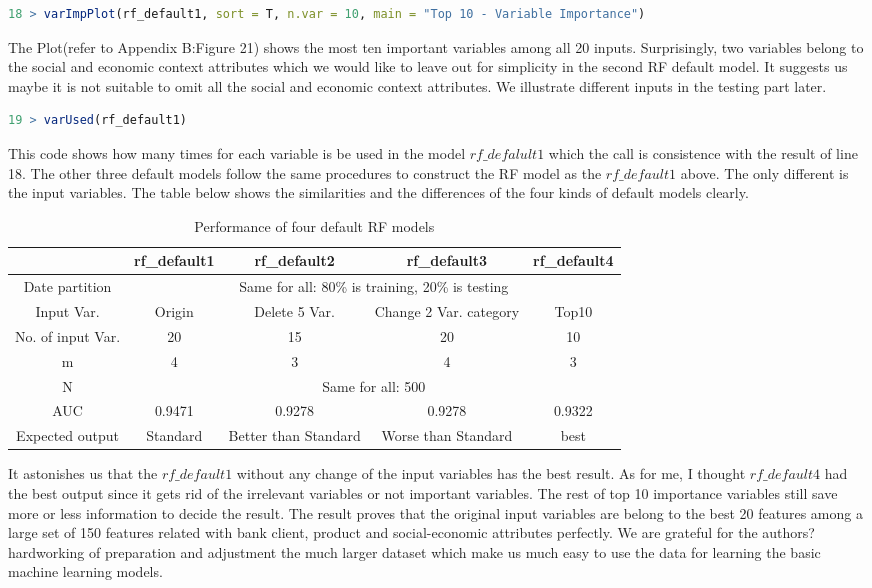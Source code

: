 \documentclass[12pt, a4paper, bibliography=totoc, english]{scrartcl}
\begin{document}
\begin{lstlisting}[language = R]
18 > varImpPlot(rf_default1, sort = T, n.var = 10, main = "Top 10 - Variable Importance")  
\end{lstlisting}
The Plot(refer to Appendix B:Figure 21) shows the most ten important variables among all 20 inputs. Surprisingly, two variables belong to the social and economic context attributes which we would like to leave out for simplicity in the second RF default model. It suggests us maybe it is not suitable to omit all the social and economic context attributes.  We illustrate different inputs in the testing part later. \\

\begin{lstlisting}[language = R]
19 > varUsed(rf_default1) 
\end{lstlisting}
This code shows how many times for each variable is be used in the model $rf\_defalult1$ which the call is consistence with the result of line 18. 
The other three default models follow the same procedures to construct the RF model as the $rf\_default1$ above.  The only different is the input variables. The table  below shows the similarities and the differences of the four kinds of default models clearly. \\

\begin{table}[htbp]
	\centering
	\begin{tabular}{|c|c|c|c|c|}\hline
		
		& rf\_default1 & rf\_default2 & rf\_default3 & rf\_default4  \\ \hline
		Date partition & \multicolumn{4}{c|}{Same for all: 80\% is training, 20\% is testing}\\ \hline
		Input Var. & Origin & Delete 5 Var. & Change 2 Var. category& Top10 \\  \hline
		No. of input Var. & 20 & 15 & 20 & 10\\ \hline
		m & 4 & 3 & 4 & 3 \\ \hline
		N &  \multicolumn{4}{c|}{Same for all: 500} \\ \hline
		AUC & 0.9471 & 0.9278 & 0.9278 & 0.9322 \\ \hline
		Expected output & Standard & Better than Standard & Worse than Standard & best \\ \hline
	\end{tabular}
	\caption{Performance of four default RF models}
\end{table}
It astonishes us that the $rf\_default1$ without any change of the input variables has the best result.  As for me, I thought $rf\_default4$ had the best output since it gets rid of the irrelevant variables or not important variables. The rest of top 10 importance variables still save more or less information to decide the result. The result proves that the original input variables are belong to the best 20 features among a large set of 150 features related with bank client, product and social-economic attributes perfectly. We are grateful for the authors? hardworking of preparation and adjustment the much larger dataset which make us much easy to use the data for learning the basic machine learning models.\\
\end{document}
